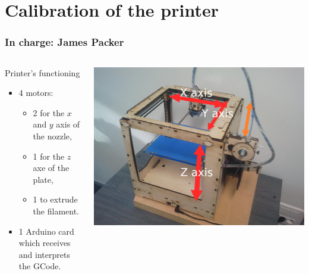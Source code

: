\documentclass{beamer}
\begin{document}
\section{Calibration of the printer}
\begin{frame}
	\frametitle{In charge: James Packer}
    
    \begin{columns}[t]
  	\begin{column}{5cm}
    \begin{block}{Printer's functioning}
	\begin{itemize}
	\item 4 motors: 
		\begin{itemize}
		\item 2 for the $x$ and $y$ axis of the nozzle,
		\item 1 for the $z$ axe of the plate,
		\item 1 to extrude the filament.
		\end{itemize}
	\item 1 Arduino card which receives and interprets the GCode.
	\end{itemize}	
    \end{block}
    \end{column}

    \begin{column}{6cm}
        \begin{center}
		\includegraphics[width=.8\textwidth]{Ultimaker2}	
		\end{center}
    \end{column}

    \end{columns}
    
\end{frame}
\end{document}
